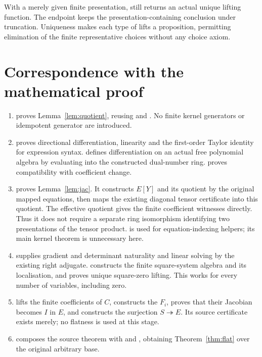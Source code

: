 \documentclass[11pt]{article}
\begin{document}
With a merely given finite presentation, 
still returns an actual unique lifting function. The endpoint
 keeps the presentation-containing conclusion under
truncation. Uniqueness makes each type of lifts a proposition, permitting
elimination of the finite representative choices without any choice axiom.

\section{Correspondence with the mathematical proof}

\begin{enumerate}
\item {} proves Lemma~\ref{lem:quotient}, reusing
 and . No finite
kernel generators or idempotent generator are introduced.
\item {} proves directional differentiation,
linearity and the first-order Taylor identity for expression syntax.
 defines differentiation on an actual free
polynomial algebra by evaluating into the constructed dual-number ring.
 proves compatibility with coefficient change.
\item {} proves Lemma~\ref{lem:jac}. It constructs
$E[Y]$ and its quotient by the original mapped equations, then maps the
existing diagonal tensor certificate into this quotient. The effective
quotient gives the finite coefficient witnesses directly. Thus it does
not require a separate ring isomorphism identifying two presentations of
the tensor product.  is used for equation-indexing
helpers; its main kernel theorem is unnecessary here.
\item {} supplies gradient and determinant
naturality and linear solving by the existing right adjugate.
 constructs the finite square-system algebra
and its localisation, and proves unique square-zero lifting. This works
for every number of variables, including zero.
\item {} lifts the finite coefficients of
$C$, constructs the $F_i$, proves that their Jacobian becomes $I$ in $E$,
and constructs the surjection $S\twoheadrightarrow E$. Its source
certificate exists merely; no flatness is used at this stage.
\item {} composes the source theorem with
 and , obtaining
Theorem~\ref{thm:flat} over the original arbitrary base.
\end{enumerate}
\end{document}
